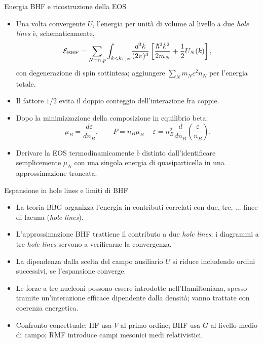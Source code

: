 \begin{frame}[t]{Energia BHF e ricostruzione della EOS}
\small
\begin{itemize}
\item Una volta convergente $U$, l'energia per unità di volume al livello a due \emph{hole lines} è, schematicamente,
\[
\mathcal E_{\rm BHF}=\sum_{N=n,p}\int_{k<k_{F,N}}\!\frac{d^3k}{(2\pi)^3}
\left[\frac{\hbar^2k^2}{2m_N}+\frac12 U_N(k)\right],
\]
con degenerazione di spin sottintesa; aggiungere $\sum_N m_Nc^2 n_N$ per l'energia totale.
\item Il fattore $1/2$ evita il doppio conteggio dell'interazione fra coppie.
\item Dopo la minimizzazione della composizione in equilibrio beta:
\[
\mu_B=\frac{d\varepsilon}{dn_B},\qquad
P=n_B\mu_B-\varepsilon
=n_B^2\frac{d}{dn_B}\left(\frac{\varepsilon}{n_B}\right).
\]
\item Derivare la EOS termodinamicamente è distinto dall'identificare semplicemente $\mu_N$ con una singola energia di quasiparticella in una approssimazione troncata.
\end{itemize}
\end{frame}

\begin{frame}[t]{Espansione in hole lines e limiti di BHF}
\small
\begin{itemize}
\item La teoria BBG organizza l'energia in contributi correlati con due, tre, ... linee di lacuna (\emph{hole lines}).
\item L'approssimazione BHF trattiene il contributo a due \emph{hole lines}; i diagrammi a tre \emph{hole lines} servono a verificarne la convergenza.
\item La dipendenza dalla scelta del campo ausiliario $U$ si riduce includendo ordini successivi, se l'espansione converge.
\item Le forze a tre nucleoni possono essere introdotte nell'Hamiltoniana, spesso tramite un'interazione efficace dipendente dalla densità; vanno trattate con coerenza energetica.
\item Confronto concettuale: HF usa $V$ al primo ordine; BHF usa $G$ al livello medio di campo; RMF introduce campi mesonici medi relativistici.
\end{itemize}
\end{frame}


